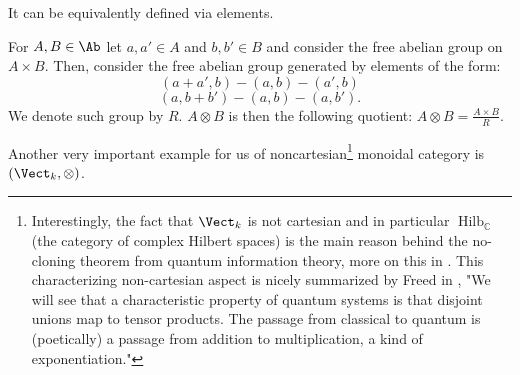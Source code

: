 \noindent It can be equivalently defined via elements.
\begin{defn}
    For $A,B\in \Ab$ let $a,a'\in A$ and $b,b'\in B$ and consider the free abelian group on $A\times B$. Then, consider the free abelian group generated by elements of the form: 
    $$(a+a',b)-(a,b)-(a',b)$$
    $$(a,b+b')-(a,b)-(a,b').$$ 
    We denote such group by $R$. $A\otimes B$ is then the following  quotient: $A\otimes B=\frac{A\times B}{R}$.
\end{defn}


Another very important example for us of noncartesian\footnote{Interestingly, the fact that $\Vect_k$ is not cartesian and in particular $\operatorname{Hilb}_\mathbb{C}$ (the category of complex Hilbert spaces) is the main reason behind the no-cloning theorem from quantum information theory, more on this in \cite{baez2004quantum}. This characterizing non-cartesian aspect is nicely summarized by Freed in \cite{freed2012cobordism}, "We will see that a characteristic property of quantum systems is that disjoint unions map to tensor products. The passage from classical to quantum is (poetically) a passage from addition to multiplication, a kind of exponentiation."} monoidal category is $(\Vect_k,\otimes)$.
